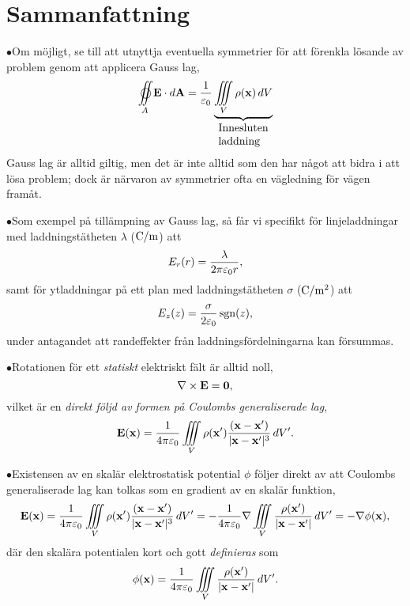 \section{Sammanfattning}
\item{$\bullet$}{Om m{\"o}jligt, se till att utnyttja eventuella symmetrier f{\"o}r att f{\"o}renkla l{\"o}sande av problem genom att applicera Gauss lag,
$$
  \oiint_A {\bf E}\cdot d{\bf A}
     ={{1}\over{\varepsilon_0}}
       \underbrace{
         \iiint_V\rho({\bf x})\,dV
       }_{\vbox{\hbox{Innesluten}\hbox{laddning}}}
$$
Gauss lag {\"a}r alltid giltig, men det {\"a}r inte alltid som den har n{\aa}got att bidra i att l{\"o}sa problem; dock {\"a}r n{\"a}rvaron av symmetrier ofta en v{\"a}gledning f{\"o}r v{\"a}gen fram{\aa}t.}
\item{$\bullet$}{Som exempel p{\aa} till{\"a}mpning av Gauss lag, s{\aa} f{\aa}r vi specifikt f{\"o}r linjeladdningar med laddnings\-t{\"a}t\-heten $\lambda$ (${\rm C}/{\rm m}$) att
$$
  E_r(r)={{\lambda}\over{2\pi\varepsilon_0 r}},
$$
samt f{\"o}r ytladdningar p{\aa} ett plan med laddningst{\"a}theten $\sigma$ (${\rm C}/{\rm m}^2$) att
$$
  E_z(z)={{\sigma}\over{2\varepsilon_0}}\sgn(z),
$$
under antagandet att randeffekter fr{\aa}n laddningsf{\"o}rdelningarna kan f{\"o}rsummas.}
\item{$\bullet$}{Rotationen f{\"o}r ett {\it statiskt} elektriskt f{\"a}lt {\"a}r alltid noll,
$$
  \nabla\times{\bf E}={\bf 0},
$$
vilket {\"a}r en {\it direkt f{\"o}ljd av formen p{\aa} Coulombs generaliserade lag},
$$
  {\bf E}({\bf x})
    ={{1}\over{4\pi\varepsilon_0}}\iiint_V\rho({\bf x}')
      {{({\bf x}-{\bf x}')}\over{|{\bf x}-{\bf x}'|^3}}\,dV'.
$$
}
\item{$\bullet$}{Existensen av en skal{\"a}r elektrostatisk potential $\phi$ f{\"o}ljer direkt av att Coulombs generaliserade lag kan tolkas som en gradient av en skal{\"a}r funktion,
$$
  {\bf E}({\bf x})
    ={{1}\over{4\pi\varepsilon_0}}\iiint_V\rho({\bf x}')
      {{({\bf x}-{\bf x}')}\over{|{\bf x}-{\bf x}'|^3}}\,dV'
    =-{{1}\over{4\pi\varepsilon_0}}\nabla\iiint_V
      {{\rho({\bf x}')}\over{|{\bf x}-{\bf x}'|}}\,dV'
    =-\nabla\phi({\bf x}),
$$
d{\"a}r den skal{\"a}ra potentialen kort och gott {\it definieras} som
$$
  \phi({\bf x})={{1}\over{4\pi\varepsilon_0}}\iiint_V
      {{\rho({\bf x}')}\over{|{\bf x}-{\bf x}'|}}\,dV'.
$$}

\bye
